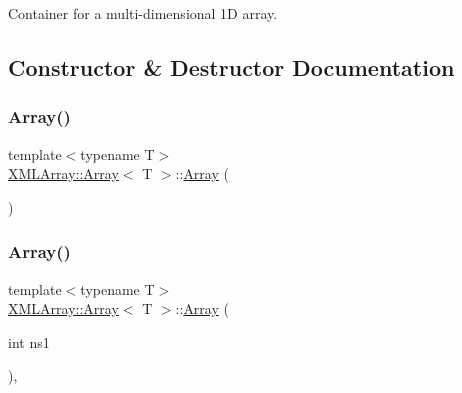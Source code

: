 Container for a multi-\/dimensional 1D array. 

\subsection{Constructor \& Destructor Documentation}
\mbox{\label{classXMLArray_1_1Array_a5b81635bef141ec21cbb11a4ae235aff}} 
\subsubsection{\texorpdfstring{Array()}{Array()}\hspace{0.1cm}{\footnotesize\ttfamily [1/9]}}
{\footnotesize\ttfamily template$<$typename T$>$ \\
\mbox{\hyperlink{classXMLArray_1_1Array}{X\+M\+L\+Array\+::\+Array}}$<$ T $>$\+::\mbox{\hyperlink{classXMLArray_1_1Array}{Array}} (\begin{DoxyParamCaption}{ }\end{DoxyParamCaption})\hspace{0.3cm}{\ttfamily [inline]}}

\mbox{\label{classXMLArray_1_1Array_ae2ff376197c96aa965c9b04297b013cd}} 
\subsubsection{\texorpdfstring{Array()}{Array()}\hspace{0.1cm}{\footnotesize\ttfamily [2/9]}}
{\footnotesize\ttfamily template$<$typename T$>$ \\
\mbox{\hyperlink{classXMLArray_1_1Array}{X\+M\+L\+Array\+::\+Array}}$<$ T $>$\+::\mbox{\hyperlink{classXMLArray_1_1Array}{Array}} (\begin{DoxyParamCaption}\item[{int}]{ns1 }\end{DoxyParamCaption})\hspace{0.3cm}{\ttfamily [inline]}, {\ttfamily [explicit]}}

\mbox{\label{classXMLArray_1_1Array_ae344c6bdb93a8e4e2b5b42fda7abf94d}} 

